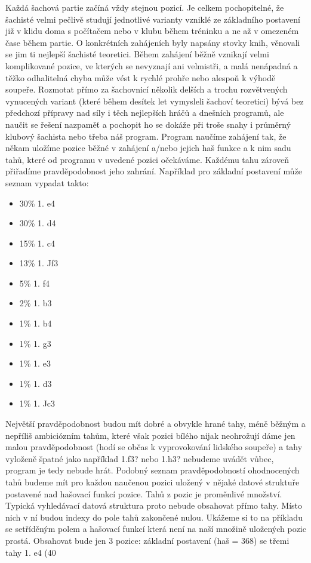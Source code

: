 \documentclass[11pt, titlepage]{article}
\begin{document}
Každá šachová partie začíná vždy stejnou pozicí. Je celkem pochopitelné, že šachisté velmi pečlivě studují jednotlivé varianty vzniklé ze základního postavení již v klidu doma s počítačem nebo v klubu během tréninku a ne až v omezeném čase během partie. O konkrétních zahájeních byly napsány stovky knih, věnovali se jim ti nejlepší šachisté teoretici. Během zahájení běžně vznikají velmi komplikované pozice, ve kterých se nevyznají ani velmistři, a malá nenápadná a těžko odhalitelná chyba může vést k rychlé prohře nebo alespoň k výhodě soupeře. Rozmotat přímo za šachovnicí několik delších a trochu rozvětvených vynucených variant (které během desítek let vymysleli šachoví teoretici) bývá bez předchozí přípravy nad síly i těch nejlepších hráčů a dnešních programů, ale naučit se řešení nazpaměť a pochopit ho se dokáže při troše snahy i průměrný klubový šachista nebo třeba náš program.
Program naučíme zahájení tak, že někam uložíme pozice běžné v zahájení a/nebo jejich haš funkce a k nim sadu tahů, které od programu v uvedené pozici očekáváme. Každému tahu zároveň přiřadíme pravděpodobnost jeho zahrání. Například pro základní postavení může seznam vypadat takto:
\begin{itemize}
	\item 30\% 1. e4
	\item 30\% 1. d4
	\item 15\% 1. c4
	\item 13\% 1. Jf3
	\item 5\% 1. f4
	\item 2\% 1. b3
	\item 1\% 1. b4
	\item 1\% 1. g3
	\item 1\% 1. e3
	\item 1\% 1. d3
	\item 1\% 1. Jc3
\end{itemize}

Největší pravděpodobnost budou mít dobré a obvykle hrané tahy, méně běžným a nepříliš ambiciózním tahům, které však pozici bílého nijak neohrožují dáme jen malou pravděpodobnost (hodí se občas k vyprovokování lidského soupeře) a tahy vyloženě špatné jako například 1.f3? nebo 1.h3? nebudeme uvádět vůbec, program je tedy nebude hrát.
Podobný seznam pravděpodobností ohodnocených tahů budeme mít pro každou naučenou pozici uložený v nějaké datové struktuře postavené nad hašovací funkcí pozice. Tahů z pozic je proměnlivé množství. Typická vyhledávací datová struktura proto nebude obsahovat přímo tahy. Místo nich v ní budou indexy do pole tahů zakončené nulou. Ukážeme si to na příkladu se setříděným polem a hašovací funkcí která není na naší množině uložených pozic prostá. Obsahovat bude jen 3 pozice: základní postavení (haš = 368) se třemi tahy 1. e4 (40%
\end{document}
